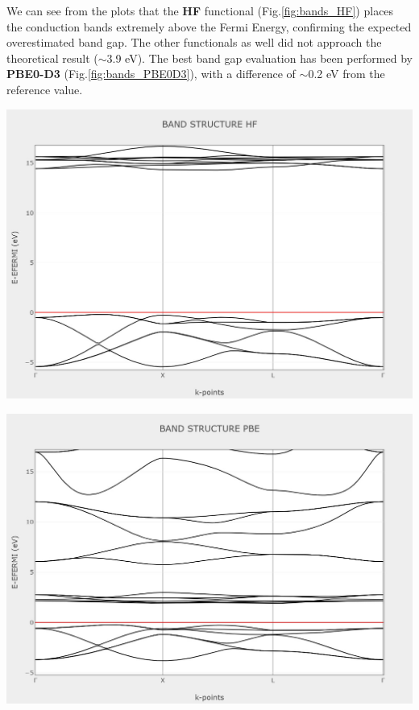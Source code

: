 \documentclass{article}
\begin{document}
We can see from the plots that the \textbf{HF} functional (Fig.\ref{fig:bands_HF}) places the conduction bands extremely above the Fermi Energy, confirming the expected overestimated band gap. The other functionals as well did not approach the theoretical result ($\sim$3.9 eV). The best band gap evaluation has been performed by \textbf{PBE0-D3} (Fig.\ref{fig:bands_PBE0D3}), with a difference of $\sim$0.2 eV from the reference value.

\vspace{15pt}

\noindent\begin{minipage}{0.45\textwidth}
	\centering
	\includegraphics[width=1\textwidth]{../images/BANDS/BAND_STRUCTURE_HF.jpeg}
    \label{fig:bands_HF}
\end{minipage}
\hfill
\begin{minipage}{0.45\textwidth}
	\centering
	\includegraphics[width=1\textwidth]{../images/BANDS/BAND_STRUCTURE_PBE.jpeg}
    \label{fig:bands_PBE}
\end{minipage}
\end{document}
